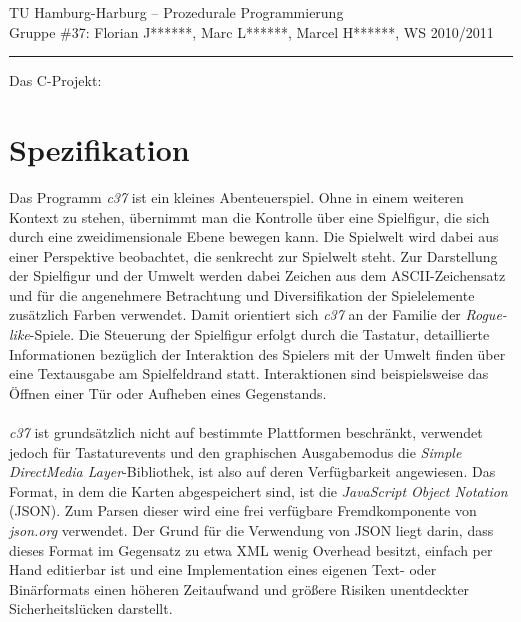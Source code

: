 \documentclass[11pt,a4paper,notitlepage]{report}
\begin{document}
	\begin{center}
		TU Hamburg-Harburg -- Prozedurale Programmierung \\
		Gruppe \#37: Florian J******, Marc L******, Marcel H******, WS 2010/2011
	\end{center}
	\rule{1.0\linewidth}{.1pt}
	\newline
	\begin{center}
		Das C-Projekt:
		\Huge
		\parbox{1.0\linewidth}{
		}
		\normalsize
	\end{center}
	
	\section*{Spezifikation}
	Das Programm \textit{c37} ist ein kleines Abenteuerspiel. Ohne in einem weiteren Kontext zu stehen, übernimmt man die Kontrolle über eine Spielfigur, die sich durch eine zweidimensionale Ebene bewegen kann. Die Spielwelt wird dabei aus einer Perspektive beobachtet, die senkrecht zur Spielwelt steht. Zur Darstellung der Spielfigur und der Umwelt werden dabei Zeichen aus dem ASCII-Zeichensatz und für die angenehmere Betrachtung und Diversifikation der Spielelemente zusätzlich Farben verwendet. Damit orientiert sich \textit{c37} an der Familie der \textit{Rogue-like}-Spiele. Die Steuerung der Spielfigur erfolgt durch die Tastatur, detaillierte Informationen bezüglich der Interaktion des Spielers mit der Umwelt finden über eine Textausgabe am Spielfeldrand statt. Interaktionen sind beispielsweise das Öffnen einer Tür oder Aufheben eines Gegenstands.
	\\
	\\
	\textit{c37} ist grundsätzlich nicht auf bestimmte Plattformen beschränkt, verwendet jedoch für Tastaturevents und den graphischen Ausgabemodus die \textit{Simple DirectMedia Layer}-Bibliothek, ist also auf deren Verfügbarkeit angewiesen. Das Format, in dem die Karten abgespeichert sind, ist die \textit{JavaScript Object Notation} (JSON). Zum Parsen dieser wird eine frei verfügbare Fremdkomponente von \textit{json.org} verwendet. Der Grund für die Verwendung von JSON liegt darin, dass dieses Format im Gegensatz zu etwa XML wenig Overhead besitzt, einfach per Hand editierbar ist und eine Implementation eines eigenen Text- oder Binärformats einen höheren Zeitaufwand und größere Risiken unentdeckter Sicherheitslücken darstellt.
	\newpage
\end{document}
